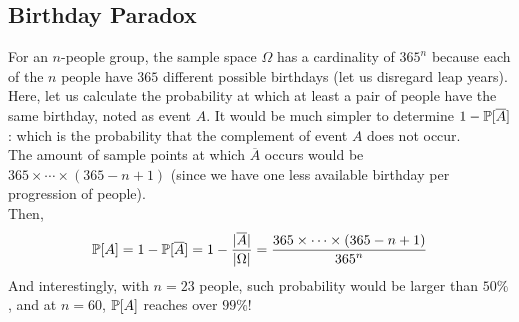\subsection{Birthday Paradox}
For an $n$-people group, the sample space $\Omega$ has a cardinality of ${365}^n$ because each of the $n$ people have $365$ different possible birthdays (let us disregard leap years). \\
Here, let us calculate the probability at which at least a pair of people have the same birthday, noted as event $A$. It would be much simpler to determine $1 - \P[\overline{A}]$: which is the probability that the complement of event $A$ does not occur. \\
The amount of sample points at which $\overline{A}$ occurs would be $365 \times \cdots \times (365 - n + 1)$ (since we have one less available birthday per progression of people). \\
Then,
\[\P[A] = 1 - \P[\overline{A}] = 1 - \frac{|\overline{A}|}{|\Omega|} = \frac{365 \times \cdots \times (365 - n + 1)}{{365}^n}\]
And interestingly, with $n = 23$ people, such probability would be larger than $50\%$, and at $n = 60$, $\P[A]$ reaches over $99\%$!

